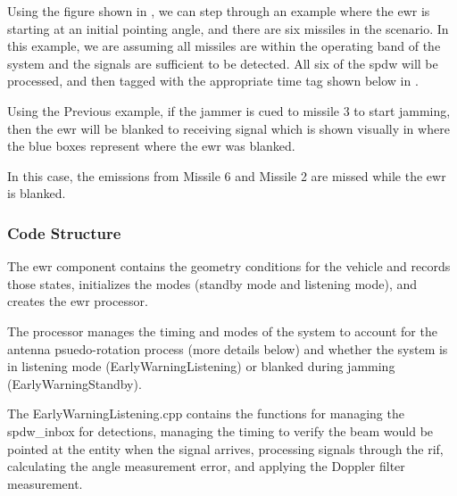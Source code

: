 
\unclass Using the figure shown in , we can step through an example where the \gls{ewr} is starting at an initial pointing angle, and there are six missiles in the scenario. In this example, we are assuming all missiles are within the operating band of the system and the signals are sufficient to be detected. All six of the \gls{spdw} will be processed, and then tagged with the appropriate time tag shown below in .


\unclass Using the Previous example, if the jammer is cued to missile 3 to start jamming, then the \gls{ewr} will be blanked to receiving signal which is shown visually in  where the blue boxes represent where the \gls{ewr} was blanked.

 In this case, the emissions from Missile 6 and Missile 2 are missed while the \gls{ewr} is blanked.



\subsubsection{\unclass \componentname Code Structure}


\unclass The \gls{ewr} component contains the geometry conditions for the vehicle and records those states, initializes the modes (standby mode and listening mode), and creates the \gls{ewr} processor.

\unclass The processor manages the timing and modes of the system to account for the antenna psuedo-rotation process (more details below) and whether the system is in listening mode (EarlyWarningListening) or blanked during jamming (EarlyWarningStandby).

\unclass The EarlyWarningListening.cpp contains the functions for managing the spdw\_inbox for detections, managing the timing to verify the beam would be pointed at the entity when the signal arrives, processing signals through the \gls{rif}, calculating the angle measurement error, and applying the Doppler filter measurement.

